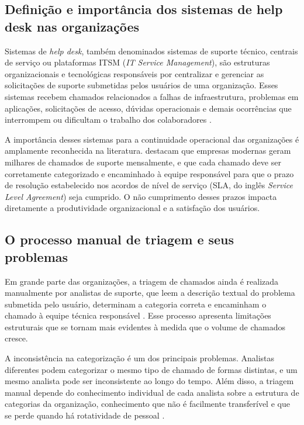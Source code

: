 \documentclass[
    12pt,                %
    openright,           %
    oneside,             %
    a4paper,             %
    english,             %
    brazil               %
]{abntex2}
\begin{document}
\subsection{Definição e importância dos sistemas de help desk nas organizações}
\label{subsec:helpdesk_definicao}

Sistemas de \textit{help desk}, também denominados sistemas de suporte técnico, centrais de serviço ou plataformas ITSM (\textit{IT Service Management}), são estruturas organizacionais e tecnológicas responsáveis por centralizar e gerenciar as solicitações de suporte submetidas pelos usuários de uma organização. Esses sistemas recebem chamados relacionados a falhas de infraestrutura, problemas em aplicações, solicitações de acesso, dúvidas operacionais e demais ocorrências que interrompem ou dificultam o trabalho dos colaboradores \cite{zemp2021}.

A importância desses sistemas para a continuidade operacional das organizações é amplamente reconhecida na literatura.  destacam que empresas modernas geram milhares de chamados de suporte mensalmente, e que cada chamado deve ser corretamente categorizado e encaminhado à equipe responsável para que o prazo de resolução estabelecido nos acordos de nível de serviço (SLA, do inglês \textit{Service Level Agreement}) seja cumprido. O não cumprimento desses prazos impacta diretamente a produtividade organizacional e a satisfação dos usuários.

\subsection{O processo manual de triagem e seus problemas}
\label{subsec:helpdesk_triagem}

Em grande parte das organizações, a triagem de chamados ainda é realizada manualmente por analistas de suporte, que leem a descrição textual do problema submetida pelo usuário, determinam a categoria correta e encaminham o chamado à equipe técnica responsável \cite{zemp2021}. Esse processo apresenta limitações estruturais que se tornam mais evidentes à medida que o volume de chamados cresce.

A inconsistência na categorização é um dos principais problemas. Analistas diferentes podem categorizar o mesmo tipo de chamado de formas distintas, e um mesmo analista pode ser inconsistente ao longo do tempo. Além disso, a triagem manual depende do conhecimento individual de cada analista sobre a estrutura de categorias da organização, conhecimento que não é facilmente transferível e que se perde quando há rotatividade de pessoal \cite{wahba2023}.
\end{document}
